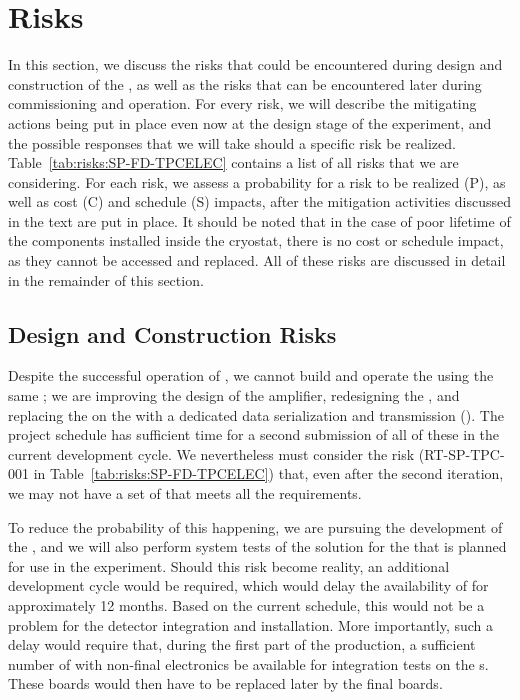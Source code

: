 \section{Risks}
\label{sec:fdsp-tpcelec-risks}

In this section, we discuss the risks that could be encountered during design
and construction of the   , as well as the
risks that can be encountered later during commissioning and operation.
For every risk, we will describe the mitigating actions 
being put in place even now at the design stage of the experiment, and the 
possible responses that we will take should a specific risk be realized. 
Table~\ref{tab:risks:SP-FD-TPCELEC} contains a list of all risks that we are 
considering. For each risk, we assess a probability for a risk to be
realized (P), as well as cost (C) and schedule (S) impacts, after the 
mitigation activities discussed in the text are put in place. It should
be noted that in the case of poor lifetime of the %
components installed inside the cryostat, there is no cost or schedule
impact, as they cannot be accessed and replaced.
All of these risks are discussed in detail in the remainder of this
section.



\subsection{Design and Construction Risks}
\label{sec:fdsp-tpcelec-risks-design}

Despite the successful operation of , we cannot build and operate
the    using the same ; we are
improving the design of the  amplifier, redesigning
the , and replacing the  on the  with a dedicated data
serialization and transmission  (). The project schedule has
sufficient time for a second submission of all of these  in the current 
development cycle. We  nevertheless must consider the risk (RT-SP-TPC-001
in Table~\ref{tab:risks:SP-FD-TPCELEC}) that, even after the second iteration, 
we may not have a set of  that meets all the  requirements.

To reduce the probability of this happening, we are pursuing the development of the  , and we
will also perform system tests of the  solution for the  that is planned 
for use in the  experiment. Should this risk become reality, an
additional development cycle would be required, which would delay the availability
of  for approximately 12 months. Based on the current schedule, this would
not be a problem for the detector integration and installation.
More importantly, such a delay would require
that, during the first part of the  production, a sufficient number
of  with non-final electronics be available for integration tests
on the s. These boards would then have to be replaced later
by the final boards.

